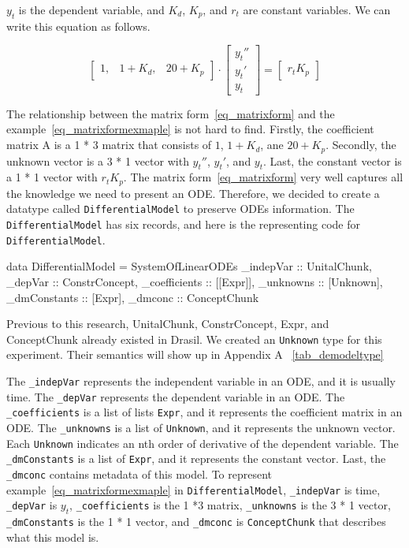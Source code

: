 $y_t$ is the dependent variable, and $K_d$, $K_p$, and $r_t$ are constant variables. We can write this equation as follows. 

\begin{equation} \label{eq_matrixformexmaple}
	\begin{bmatrix}
		1, & 1 + K_{d}, & 20 + K_{p}
	\end{bmatrix}
	\cdot
	\begin{bmatrix}
		y_{t}''  \\
		y_{t}'   \\
		y_{t}  
	\end{bmatrix}
	=
	\begin{bmatrix}
		r_{t} K_{p} 
	\end{bmatrix}
\end{equation}

The relationship between the matrix form~\ref{eq_matrixform} and the example~\ref{eq_matrixformexmaple} is not hard to find. Firstly, the coefficient matrix A is a 1 * 3 matrix that consists of $1$, $1 + K_d$, ane $20 + K_p$. Secondly, the unknown vector is a 3 * 1 vector with $y_t''$, $y_t'$, and $y_t$. Last, the constant vector is a 1 * 1 vector with $r_t K_p$. The matrix form~\ref{eq_matrixform} very well captures all the knowledge we need to present an ODE. Therefore, we decided to create a datatype called \verb|DifferentialModel| to preserve ODEs information. The \verb|DifferentialModel| has six records, and here is the representing code for \verb|DifferentialModel|.
\begin{haskell1}
data DifferentialModel = SystemOfLinearODEs {
	_indepVar :: UnitalChunk,
	_depVar :: ConstrConcept,
	_coefficients :: [[Expr]],
	_unknowns :: [Unknown],
	_dmConstants :: [Expr],
	_dmconc :: ConceptChunk
}
\end{haskell1}

Previous to this research, UnitalChunk, ConstrConcept, Expr, and ConceptChunk already existed in Drasil. We created an \verb|Unknown| type for this experiment. Their semantics will show up in Appendix A ~\ref{tab_demodeltype}

The \verb|_indepVar| represents the independent variable in an ODE, and it is usually time. The \verb|_depVar| represents the dependent variable in an ODE. The \verb|_coefficients| is a list of lists \verb|Expr|, and it represents the coefficient matrix in an ODE. The \verb|_unknowns| is a list of \verb|Unknown|, and it represents the unknown vector. Each \verb|Unknown| indicates an nth order of derivative of the dependent variable. The \verb|_dmConstants| is a list of \verb|Expr|, and it represents the constant vector. Last, the \verb|_dmconc| contains metadata of this model. To represent example~\ref{eq_matrixformexmaple} in \verb|DifferentialModel|, \verb|_indepVar| is time, \verb|_depVar| is $y_t$, \verb|_coefficients| is the 1 *3 matrix, \verb|_unknowns| is the 3 * 1 vector, \verb|_dmConstants| is the 1 * 1 vector, and \verb|_dmconc| is \verb|ConceptChunk| that describes what this model is.

